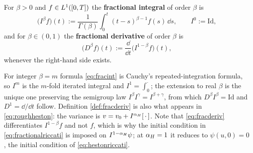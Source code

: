 \begin{definition}\label{def:fracderiv}
For $\beta>0$ and $f\in L^1([0,T])$ the \textbf{fractional integral} of order $\beta$ is
\begin{equation}\label{eq:fracint}
\bigl(I^{\beta}f\bigr)(t) := \frac{1}{\Gamma(\beta)}\int_0^t (t-s)^{\beta-1}f(s)\,\dd s,
\qquad I^0 := \mathrm{Id},
\end{equation}
and for $\beta\in(0,1)$ the \textbf{fractional derivative} of order $\beta$ is
\begin{equation}\label{eq:fracderiv}
\bigl(D^{\beta}f\bigr)(t) := \frac{\dd}{\dd t}\bigl(I^{1-\beta}f\bigr)(t),
\end{equation}
whenever the right-hand side exists.
\end{definition}

For integer $\beta = m$ formula \eqref{eq:fracint} is Cauchy's repeated-integration
formula, so $I^m$ is the $m$-fold iterated integral and $I^1=\int_0^\cdot$; the
extension to real $\beta$ is the unique one preserving the semigroup law
$I^{\beta}I^{\gamma}=I^{\beta+\gamma}$, from which $D^{\beta}I^{\beta}=\mathrm{Id}$
and $D^1 = \dd/\dd t$ follow. Definition \ref{def:fracderiv} is also what appears in
\eqref{eq:roughheston}: the variance is $v = v_0 + I^{\alpha_H}[\,\cdot\,]$.
Note that \eqref{eq:fracderiv} differentiates $I^{1-\beta}f$ and not $f$, which is why
the initial condition in \eqref{eq:fractionalriccati} is imposed on
$I^{1-\alpha_H}\psi$; at $\alpha_H=1$ it reduces to $\psi(u,0)=0$, the
initial condition of \eqref{eq:hestonriccati}.

